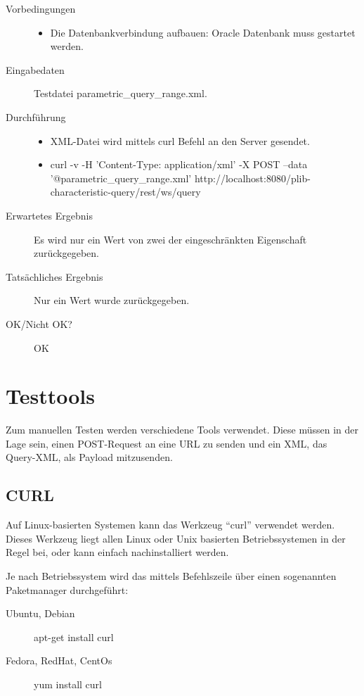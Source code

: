 \begin{description}
\item[Vorbedingungen] 
  \begin{itemize}
   \item Die Datenbankverbindung aufbauen: Oracle Datenbank muss gestartet werden.
  \end{itemize}
\item[Eingabedaten] Testdatei parametric\_query\_range.xml. 
\item[Durchführung]
   \begin{itemize}
   \item XML-Datei wird mittels curl Befehl an den Server gesendet.
   \item curl -v -H 'Content-Type: application/xml' -X POST --data '@parametric\_query\_range.xml' http://localhost:8080/plib-characteristic-query/rest/ws/query
  \end{itemize}
\item[Erwartetes Ergebnis] Es wird nur ein Wert von zwei der eingeschränkten Eigenschaft zurückgegeben.  
\item[Tatsächliches Ergebnis] Nur ein Wert wurde zurückgegeben. 
\item[OK/Nicht OK?] OK
\end{description}

\section{Testtools}\label{anh:testtools}

Zum manuellen Testen werden verschiedene Tools verwendet. Diese müssen in der Lage sein, einen POST-Request an eine URL zu senden und ein XML, das Query-XML, als Payload mitzusenden.

\subsection{CURL}

Auf Linux-basierten Systemen kann das Werkzeug \enquote{curl} verwendet werden. Dieses Werkzeug liegt allen Linux oder Unix basierten Betriebssystemen in der Regel bei, oder kann einfach nachinstalliert werden. 

Je nach Betriebssystem wird das mittels Befehlszeile über einen sogenannten Paketmanager durchgeführt:
\begin{description}
\item[Ubuntu, Debian] apt-get install curl
\item[Fedora, RedHat, CentOs] yum install curl
\end{description}


